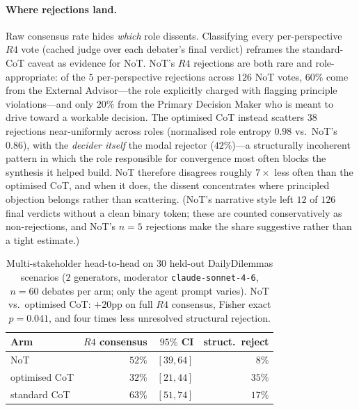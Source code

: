 \documentclass[11pt]{article}
\begin{document}
\paragraph{Where rejections land.} Raw consensus rate hides
\emph{which} role dissents. Classifying every per-perspective
$R4$ vote (cached judge over each debater's final verdict)
reframes the standard-CoT caveat as evidence for NoT. NoT's $R4$
rejections are both rare and role-appropriate: of the $5$
per-perspective rejections across $126$ NoT votes, $60\%$ come
from the External Advisor---the role explicitly charged with
flagging principle violations---and only $20\%$ from the Primary
Decision Maker who is meant to drive toward a workable decision.
The optimised CoT instead scatters $38$ rejections near-uniformly
across roles (normalised role entropy $0.98$ vs.\ NoT's $0.86$),
with the \emph{decider itself} the modal rejector ($42\%$)---a
structurally incoherent pattern in which the role responsible for
convergence most often blocks the synthesis it helped build. NoT
therefore disagrees roughly $7{\times}$ less often than the
optimised CoT, and when it does, the dissent concentrates where
principled objection belongs rather than scattering. (NoT's
narrative style left $12$ of $126$ final verdicts without a clean
binary token; these are counted conservatively as non-rejections,
and NoT's $n = 5$ rejections make the share suggestive rather than
a tight estimate.)

\begin{table}[!htbp]
\centering
\small
\setlength{\tabcolsep}{4pt}
\begin{tabular}{lrrr}
\toprule
Arm & $R4$ consensus & $95\%$ CI & struct.\ reject \\
\midrule
NoT                 & $52\%$ & $[39, 64]$ & $8\%$  \\
optimised CoT       & $32\%$ & $[21, 44]$ & $35\%$ \\
standard CoT        & $63\%$ & $[51, 74]$ & $17\%$ \\
\bottomrule
\end{tabular}
\caption{Multi-stakeholder head-to-head on $30$ held-out
DailyDilemmas scenarios ($2$ generators, moderator
\texttt{claude-sonnet-4-6}, $n = 60$ debates per arm; only the
agent prompt varies). NoT vs.\ optimised CoT: $+20$pp on full
$R4$ consensus, Fisher exact $p = 0.041$, and four times less
unresolved structural rejection.}
\label{tab:tg_debate}
\end{table}
\end{document}
